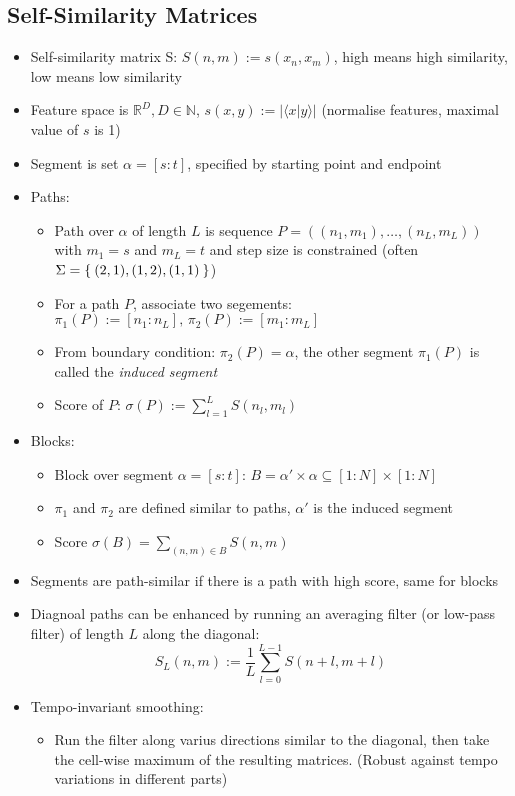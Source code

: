\documentclass[fleqn,12pt]{scrartcl}
\newcommand{\abs}[1]{
	\left \vert #1 \right \vert
}
\begin{document}
\subsection{Self-Similarity Matrices}
\begin{itemize}
	\item
		Self-similarity matrix S: $S(n,m) := s(x_n, x_m)$, high means high similarity, low means low similarity
	\item
		Feature space is $\mathbb{R}^D, D \in \mathbb{N}$, $s(x,y) := \abs{\langle x|y\rangle}$ (normalise features, maximal value of $s$ is 1)
	\item
		Segment is set $\alpha = [s : t]$, specified by starting point and endpoint
	\item Paths:
		\begin{itemize}
			\item
				Path over $\alpha$ of length $L$ is sequence $P = ((n_1,m_1), \dots , (n_L, m_L))$ with $m_1 = s$ and $m_L = t$ and step size is constrained (often $\Sigma = \Set{(2,1), (1,2), (1,1)}$)
			\item
				For a path $P$, associate two segements: $\pi_1(P) := [n_1 : n_L],\, \pi_2(P) := [m_1 : m_L]$
			\item
				From boundary condition: $\pi_2(P) = \alpha$, the other segment $\pi_1(P)$ is called the \textit{induced segment}
			\item
				Score of $P$: $\sigma(P) := \sum_{l=1}^L S(n_l, m_l)$
		\end{itemize}
	\item
		Blocks:
		\begin{itemize}
			\item
				Block over segment $\alpha = [s:t]$: $B = \alpha' \times \alpha \subseteq [1:N] \times [1:N]$
			\item
				$\pi_1$ and $\pi_2$ are defined similar to paths, $\alpha'$ is the induced segment
			\item
				Score $\sigma(B) = \sum_{(n,m) \in B} S(n,m)$
		\end{itemize}
	\item
		Segments are path-similar if there is a path with high score, same for blocks
	\item
		Diagnoal paths can be enhanced by running an averaging filter (or low-pass filter) of length $L$ along the diagonal:
		$$S_L(n,m) := \frac1L \sum_{l = 0}^{L-1} S(n+l,m+l)$$
	\item
		Tempo-invariant smoothing:
		\begin{itemize}
			\item Run the filter along varius directions similar to the diagonal, then take the cell-wise maximum of the resulting matrices. (Robust against tempo variations in different parts)

\end{itemize}
\end{itemize}
\end{document}
